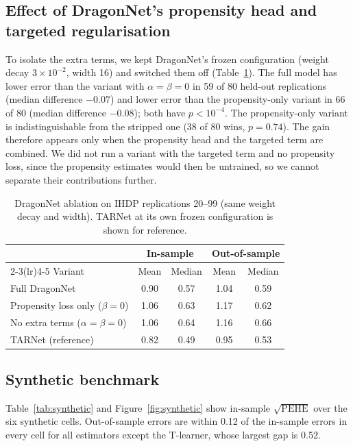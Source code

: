 \documentclass[10pt]{article}
\begin{document}
\subsection{Effect of DragonNet's propensity head and targeted regularisation}

To isolate the extra terms, we kept DragonNet's frozen configuration (weight decay $3\times10^{-2}$, width 16) and switched them off (Table~\ref{tab:ablation}). The full model has lower error than the variant with $\alpha=\beta=0$ in 59 of 80 held-out replications (median difference $-0.07$) and lower error than the propensity-only variant in 66 of 80 (median difference $-0.08$); both have $p<10^{-4}$. The propensity-only variant is indistinguishable from the stripped one (38 of 80 wins, $p=0.74$). The gain therefore appears only when the propensity head and the targeted term are combined. We did not run a variant with the targeted term and no propensity loss, since the propensity estimates would then be untrained, so we cannot separate their contributions further.

\begin{table}[t]
\centering
\small
\caption{DragonNet ablation on IHDP replications 20--99 (same weight decay and width). TARNet at its own frozen configuration is shown for reference.}
\label{tab:ablation}
\begin{tabular}{lcccc}
\toprule
 & \multicolumn{2}{c}{In-sample} & \multicolumn{2}{c}{Out-of-sample} \\
\cmidrule(lr){2-3}\cmidrule(lr){4-5}
Variant & Mean & Median & Mean & Median \\
\midrule
Full DragonNet & 0.90 & 0.57 & 1.04 & 0.59 \\
Propensity loss only ($\beta=0$) & 1.06 & 0.63 & 1.17 & 0.62 \\
No extra terms ($\alpha=\beta=0$) & 1.06 & 0.64 & 1.16 & 0.66 \\
TARNet (reference) & 0.82 & 0.49 & 0.95 & 0.53 \\
\bottomrule
\end{tabular}
\end{table}

\subsection{Synthetic benchmark}

Table~\ref{tab:synthetic} and Figure~\ref{fig:synthetic} show in-sample $\sqrt{\mathrm{PEHE}}$ over the six synthetic cells. Out-of-sample errors are within 0.12 of the in-sample errors in every cell for all estimators except the T-learner, whose largest gap is 0.52.
\end{document}
